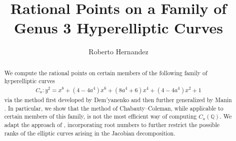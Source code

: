 \documentclass{article}
\title{Rational Points on a Family of Genus 3 Hyperelliptic Curves}
\author{Roberto Hernandez}
\affil{University of California, Irvine}
\date{\vspace{-5ex}}
\newcommand{\Q}{\mathbb{Q}}
\theoremstyle{definition}
\begin{document}
\maketitle

\begin{abstract}
\noindent We compute the rational points on certain members of the following family of hyperelliptic curves
\begin{eqnarray*}
    C_a \colon y^2 = x^8 + (4-4a^4) x^6 + (8a^4 + 6)x^4 + (4-4a^4)x^2 + 1
\end{eqnarray*}
via the method first developed by Dem'yanenko \cite{dem1966rational} and then further generalized by Manin \cite{manin1969p}. In particular, we show that the method of Chabauty--Coleman, while applicable to certain members of this family, is not the most efficient way of computing $C_a(\Q)$. We adapt the approach of \cite{kulesz1999application}, incorporating root numbers to further restrict the possible ranks of the elliptic curves arising in the Jacobian decomposition.
\end{abstract}

\end{document}
